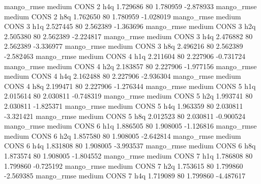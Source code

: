        mango_rmse     medium     CONS                 2                  h4q  1.729686 80       1.780959          -2.878933
       mango_rmse     medium     CONS                 2                  h8q  1.762650 80       1.780959          -1.028019
       mango_rmse     medium     CONS                 3                  h1q  2.527445 80       2.562389          -1.363696
       mango_rmse     medium     CONS                 3                  h2q  2.505380 80       2.562389          -2.224817
       mango_rmse     medium     CONS                 3                  h4q  2.476882 80       2.562389          -3.336977
       mango_rmse     medium     CONS                 3                  h8q  2.496216 80       2.562389          -2.582463
       mango_rmse     medium     CONS                 4                  h1q  2.211604 80       2.227906          -0.731724
       mango_rmse     medium     CONS                 4                  h2q  2.183857 80       2.227906          -1.977156
       mango_rmse     medium     CONS                 4                  h4q  2.162488 80       2.227906          -2.936304
       mango_rmse     medium     CONS                 4                  h8q  2.199471 80       2.227906          -1.276344
       mango_rmse     medium     CONS                 5                  h1q  2.015614 80       2.030811          -0.748319
       mango_rmse     medium     CONS                 5                  h2q  1.993741 80       2.030811          -1.825371
       mango_rmse     medium     CONS                 5                  h4q  1.963359 80       2.030811          -3.321421
       mango_rmse     medium     CONS                 5                  h8q  2.012523 80       2.030811          -0.900524
       mango_rmse     medium     CONS                 6                  h1q  1.886505 80       1.908005          -1.126816
       mango_rmse     medium     CONS                 6                  h2q  1.857580 80       1.908005          -2.642814
       mango_rmse     medium     CONS                 6                  h4q  1.831808 80       1.908005          -3.993537
       mango_rmse     medium     CONS                 6                  h8q  1.873574 80       1.908005          -1.804552
       mango_rmse     medium     CONS                 7                  h1q  1.786808 80       1.799860          -0.725192
       mango_rmse     medium     CONS                 7                  h2q  1.753615 80       1.799860          -2.569385
       mango_rmse     medium     CONS                 7                  h4q  1.719089 80       1.799860          -4.487617
